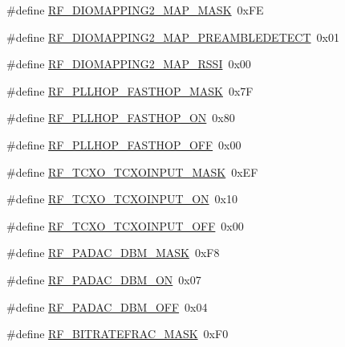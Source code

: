 \begin{DoxyCompactItemize}
\item 
\#define \mbox{\hyperlink{sx1276_regs-_fsk_8h_aa2e45e0e210e6bb7c122982f17433ad4}{R\+F\+\_\+\+D\+I\+O\+M\+A\+P\+P\+I\+N\+G2\+\_\+\+M\+A\+P\+\_\+\+M\+A\+SK}}~0x\+FE
\item 
\#define \mbox{\hyperlink{sx1276_regs-_fsk_8h_a6a4137adde392024770632b94ce5b78a}{R\+F\+\_\+\+D\+I\+O\+M\+A\+P\+P\+I\+N\+G2\+\_\+\+M\+A\+P\+\_\+\+P\+R\+E\+A\+M\+B\+L\+E\+D\+E\+T\+E\+CT}}~0x01
\item 
\#define \mbox{\hyperlink{sx1276_regs-_fsk_8h_a6e81c871f9411523c67383b1accfac64}{R\+F\+\_\+\+D\+I\+O\+M\+A\+P\+P\+I\+N\+G2\+\_\+\+M\+A\+P\+\_\+\+R\+S\+SI}}~0x00
\item 
\#define \mbox{\hyperlink{sx1276_regs-_fsk_8h_a840e28ff315779d1bb03dbdde40d099b}{R\+F\+\_\+\+P\+L\+L\+H\+O\+P\+\_\+\+F\+A\+S\+T\+H\+O\+P\+\_\+\+M\+A\+SK}}~0x7F
\item 
\#define \mbox{\hyperlink{sx1276_regs-_fsk_8h_aca81d0d430dc3da63986cfec9c71419f}{R\+F\+\_\+\+P\+L\+L\+H\+O\+P\+\_\+\+F\+A\+S\+T\+H\+O\+P\+\_\+\+ON}}~0x80
\item 
\#define \mbox{\hyperlink{sx1276_regs-_fsk_8h_a212139c0fe426dc287805ec078162052}{R\+F\+\_\+\+P\+L\+L\+H\+O\+P\+\_\+\+F\+A\+S\+T\+H\+O\+P\+\_\+\+O\+FF}}~0x00
\item 
\#define \mbox{\hyperlink{sx1276_regs-_fsk_8h_aa006a0facb06e3841fd1b526a2e33a63}{R\+F\+\_\+\+T\+C\+X\+O\+\_\+\+T\+C\+X\+O\+I\+N\+P\+U\+T\+\_\+\+M\+A\+SK}}~0x\+EF
\item 
\#define \mbox{\hyperlink{sx1276_regs-_fsk_8h_a617bfeb60948f03de66b96101a3db22f}{R\+F\+\_\+\+T\+C\+X\+O\+\_\+\+T\+C\+X\+O\+I\+N\+P\+U\+T\+\_\+\+ON}}~0x10
\item 
\#define \mbox{\hyperlink{sx1276_regs-_fsk_8h_a120ffcbc3af395153eacc2b979c9e682}{R\+F\+\_\+\+T\+C\+X\+O\+\_\+\+T\+C\+X\+O\+I\+N\+P\+U\+T\+\_\+\+O\+FF}}~0x00
\item 
\#define \mbox{\hyperlink{sx1276_regs-_fsk_8h_a9169e38a9e608f0dc7fd94af67d8a2e6}{R\+F\+\_\+\+P\+A\+D\+A\+C\+\_\+D\+B\+M\+\_\+\+M\+A\+SK}}~0x\+F8
\item 
\#define \mbox{\hyperlink{sx1276_regs-_fsk_8h_ad3f69e485ca56bb333524e2be1687363}{R\+F\+\_\+\+P\+A\+D\+A\+C\+\_\+D\+B\+M\+\_\+\+ON}}~0x07
\item 
\#define \mbox{\hyperlink{sx1276_regs-_fsk_8h_a2e97c98b3d6f8ae20dc9241ef5b346d7}{R\+F\+\_\+\+P\+A\+D\+A\+C\+\_\+D\+B\+M\+\_\+\+O\+FF}}~0x04
\item 
\#define \mbox{\hyperlink{sx1276_regs-_fsk_8h_a15a3a7765ab924197cdf57cbe3fc1160}{R\+F\+\_\+\+B\+I\+T\+R\+A\+T\+E\+F\+R\+A\+C\+\_\+\+M\+A\+SK}}~0x\+F0

\end{DoxyCompactItemize}
